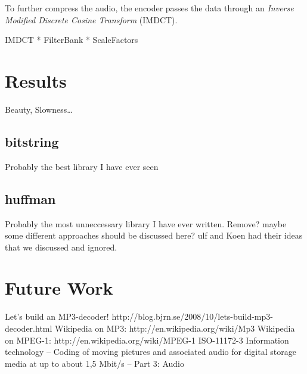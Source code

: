 \documentclass[a4paper,12pt]{article}
\begin{document}
        To further compress the audio, the encoder passes the data through an
        \textit{Inverse Modified Discrete Cosine Transform} (IMDCT).

        IMDCT * FilterBank * ScaleFactors

\section{Results}
    Beauty, Slowness\ldots
    \subsection{bitstring}
    \label{sec:bitstring}
        Probably the best library I have ever seen
    \subsection{huffman}
    \label{sec:huffman}
        Probably the most unneccessary library I have ever written. Remove?
        maybe some different approaches should be discussed here? ulf and Koen
        had their ideas that we discussed and ignored.

\section{Future Work}

\begin{thebibliography}{99}
        Let's build an MP3-decoder!
        http://blog.bjrn.se/2008/10/lets-build-mp3-decoder.html
        Wikipedia on MP3: http://en.wikipedia.org/wiki/Mp3
        Wikipedia on MPEG-1: http://en.wikipedia.org/wiki/MPEG-1
        ISO-11172-3 Information technology -- Coding of moving pictures and
        associated audio for digital storage media at up to about 1,5 Mbit/s --
        Part 3: Audio
\end{thebibliography}
\end{document}
